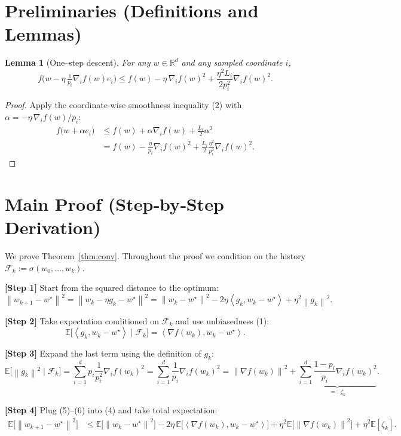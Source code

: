 \documentclass{article}
\newtheorem{lemma}{Lemma}
\newcommand{\E}{\mathbb{E}}
\newcommand{\R}{\mathbb{R}}
\newcommand{\norm}[1]{\left\lVert #1\right\rVert}
\newcommand{\ip}[2]{\left\langle #1,#2\right\rangle}
\begin{document}
\section*{Preliminaries (Definitions and Lemmas)}
\begin{lemma}[One–step descent]\label{lem:descent}
For any $w\in\R^{d}$ and any sampled coordinate $i$,
\[
f\!\bigl(w-\eta\,\tfrac{1}{p_i}\nabla_i f(w)e_i\bigr)
\le f(w)-\eta\,\nabla_i f(w)^{2}
     +\frac{\eta^{2}L_i}{2p_i^{2}}\nabla_i f(w)^{2}.
\]
\end{lemma}
\begin{proof}
Apply the coordinate‑wise smoothness inequality (2) with
$\alpha=-\eta\,\nabla_i f(w)/p_i$:
\[
\begin{aligned}
f\bigl(w+\alpha e_i\bigr)
&\le f(w)+\alpha \nabla_i f(w)+\frac{L_i}{2}\alpha^{2}\\[2mm]
&= f(w)-\frac{\eta}{p_i}\nabla_i f(w)^{2}
   +\frac{L_i}{2}\frac{\eta^{2}}{p_i^{2}}\nabla_i f(w)^{2}.
\end{aligned}
\]
\end{proof}

\section*{Main Proof (Step‑by‑Step Derivation)}
We prove Theorem~\ref{thm:conv}. Throughout the proof we condition on the
history $\mathcal{F}_k:=\sigma(w_0,\dots,w_k)$.

\noindent\textbf{[Step 1]}  Start from the squared distance to the optimum:
\[
\norm{w_{k+1}-w^{\star}}^{2}
= \norm{w_k-\eta g_k-w^{\star}}^{2}
= \norm{w_k-w^{\star}}^{2}
   -2\eta\ip{g_k}{w_k-w^{\star}}
   +\eta^{2}\norm{g_k}^{2}.
\tag{4}
\]

\noindent\textbf{[Step 2]}  Take expectation conditioned on $\mathcal{F}_k$ and use
unbiasedness (1):
\[
\E\!\bigl[\ip{g_k}{w_k-w^{\star}}\mid\mathcal{F}_k\bigr]
   =\ip{\nabla f(w_k)}{w_k-w^{\star}}.
\tag{5}
\]

\noindent\textbf{[Step 3]}  Expand the last term using the definition of $g_k$:
\[
\E\!\bigl[\norm{g_k}^{2}\mid\mathcal{F}_k\bigr]
   =\sum_{i=1}^{d}p_i\frac{1}{p_i^{2}}\nabla_i f(w_k)^{2}
   =\sum_{i=1}^{d}\frac{1}{p_i}\nabla_i f(w_k)^{2}
   =\norm{\nabla f(w_k)}^{2}+\underbrace{\sum_{i=1}^{d}
      \frac{1-p_i}{p_i}\nabla_i f(w_k)^{2}}_{=: \, \zeta_k}.
\tag{6}
\]

\noindent\textbf{[Step 4]}  Plug (5)–(6) into (4) and take total expectation:
\[
\begin{aligned}
\E\!\bigl[\norm{w_{k+1}-w^{\star}}^{2}\bigr]
&\le \E\!\bigl[\norm{w_k-w^{\star}}^{2}\bigr]
   -2\eta\,\E\!\bigl[\ip{\nabla f(w_k)}{w_k-w^{\star}}\bigr]
   +\eta^{2}\E\!\bigl[\norm{\nabla f(w_k)}^{2}\bigr]
   +\eta^{2}\E[\zeta_k].
\end{aligned}
\tag{7}
\]
\end{document}
